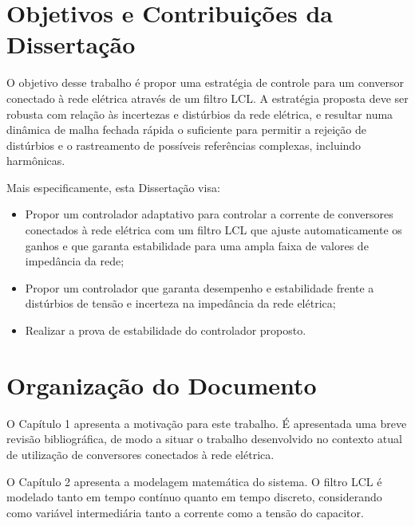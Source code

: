 

\section{Objetivos e Contribuições da Dissertação}

	O objetivo desse trabalho é propor uma estratégia de controle para um conversor
	conectado à rede elétrica através de um filtro LCL. A estratégia proposta deve
	ser robusta com relação às incertezas e distúrbios da rede elétrica, e resultar
	numa dinâmica de malha fechada rápida o suficiente para permitir a rejeição de
	distúrbios e o rastreamento de possíveis referências complexas, incluindo harmônicas.

	Mais especificamente, esta Dissertação visa:

	\begin{itemize}
		\item Propor um controlador adaptativo para controlar a corrente de conversores
			conectados à rede elétrica com um filtro LCL que ajuste automaticamente os
			ganhos e que garanta estabilidade para uma ampla faixa de valores de
			impedância da rede;
		\item Propor um controlador que garanta desempenho e estabilidade frente a
			distúrbios de tensão e incerteza na impedância da rede elétrica;
		\item Realizar a prova de estabilidade do controlador proposto.
	\end{itemize}


\section{Organização do Documento}

	O Capítulo 1 apresenta a motivação para este trabalho. É apresentada uma breve
	revisão bibliográfica, de modo a situar o trabalho desenvolvido no contexto atual
	de utilização de conversores conectados à rede elétrica.

	O Capítulo 2 apresenta a modelagem matemática do sistema. O filtro LCL é modelado
	tanto em tempo contínuo quanto em tempo discreto, considerando como variável
	intermediária tanto a corrente como a tensão do capacitor.


